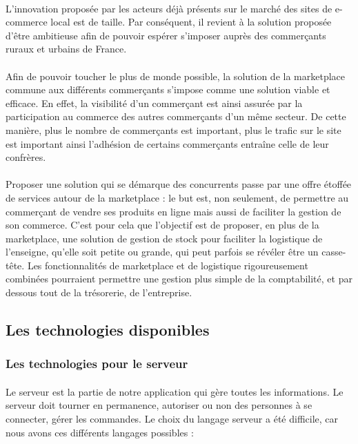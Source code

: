 \documentclass[a4paper, 12pt]{article}
\begin{document}
\paragraph{}L'innovation proposée par les acteurs déjà présents sur le marché des sites de e-commerce local est de taille. Par conséquent, il revient à la solution proposée d’être ambitieuse afin de pouvoir espérer s’imposer auprès des commerçants ruraux et urbains de France.
\paragraph{}Afin de pouvoir toucher le plus de monde possible, la solution de la marketplace commune aux différents commerçants s’impose comme une solution viable et efficace. En effet, la visibilité d’un commerçant est ainsi assurée par la participation au commerce des autres commerçants d’un même secteur. De cette manière, plus le nombre de commerçants est important, plus le trafic sur le site est important ainsi l'adhésion de certains commerçants entraîne celle de leur confrères.
\paragraph{}Proposer une solution qui se démarque des concurrents passe par une offre étoffée de services autour de la marketplace : le but est, non seulement, de permettre au commerçant de vendre ses produits en ligne mais aussi de faciliter la gestion de son commerce. C’est pour cela que l’objectif est de proposer, en plus de la marketplace, une solution de gestion de stock pour faciliter la logistique de l’enseigne, qu’elle soit petite ou grande, qui peut parfois se révéler être un casse-tête. Les fonctionnalités de marketplace et de logistique rigoureusement combinées pourraient permettre une gestion plus simple de la comptabilité, et par dessous tout de la trésorerie, de l’entreprise.

\subsection{Les technologies disponibles}

\subsubsection{Les technologies pour le serveur}
\paragraph{}Le serveur est la partie de notre application qui gère toutes les informations. Le serveur doit tourner en permanence, autoriser ou non des personnes à se connecter, gérer les commandes. Le choix du langage serveur a été difficile, car nous avons ces différents langages possibles :
\end{document}
